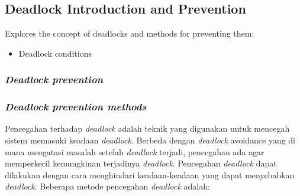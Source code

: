 \documentclass[12pt]{article}
\begin{document}
\subsection{Deadlock Introduction and Prevention}
Explores the concept of deadlocks and methods for preventing them:
\begin{itemize}
    \item Deadlock conditions
\end{itemize}
\subsubsection{\textit{Deadlock prevention}}

\subsubsection{\textit{Deadlock prevention methods}}

\hspace{1cm} Pencegahan terhadap \textit{deadlock} adalah teknik yang digunakan untuk mencegah sistem memasuki keadaan \textit{deadlock}.
Berbeda dengan \textit{deadlock} avoidance yang di mana mengatasi masalah setelah \textit{deadlock} terjadi, pencegahan ada agar memperkecil
kemungkinan terjadinya \textit{deadlock}. Pencegahan \textit{deadlock} dapat dilakukan dengan cara menghindari keadaan-keadaan yang dapat menyebabkan \textit{deadlock}.
Beberapa metode pencegahan \textit{deadlock} adalah:
\end{document}

